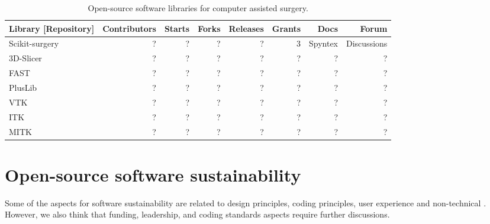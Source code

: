 \documentclass{article}
\begin{document}

\begin{table}[h]
\centering
\begin{tabular}{l|r|r|r|r|r|r|r} %
Library [Repository] & Contributors & Starts & Forks & Releases  &  Grants & Docs & Forum  \\ %
\hline

Scikit-surgery \cite{scikitsurgery-repo} & ? & ? & ?& ? & 3 & Spyntex & Discussions \\ %
3D-Slicer \cite{slicer-repo} & ? & ? & ?& ? & ? & ? & ? \\ %
FAST \cite{fast-repo} & ? & ? & ?& ? & ? & ? & ? \\ %
PlusLib \cite{plus-repo} & ? & ? & ?& ? & ? & ? & ? \\ %
VTK \cite{vtk-repo} & ? & ? & ?& ? & ? & ? & ? \\ %
ITK \cite{itk-repo} & ? & ? & ?& ? & ? & ? & ? \\ %
MITK \cite{mitk-repo} & ? & ? & ?& ? & ? & ? & ? \\ %



\end{tabular}
\caption{Open-source software libraries for computer assisted surgery.}
\label{table2}
\end{table}


\section{Open-source software sustainability}
Some of the aspects for software sustainability are related to design principles, coding principles, user experience and non-technical \cite{imran2019software}. However, we also think that funding, leadership, and coding standards aspects require further discussions.
\end{document}
